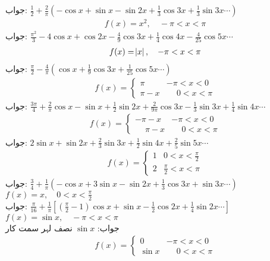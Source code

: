جواب:\quad 
$\tfrac{1}{2}+\tfrac{2}{\pi}(-\cos x+\sin x-\sin 2x+\tfrac{1}{3}\cos 3x+\tfrac{1}{3}\sin 3x\cdots)$
\begin{align*}
f(x)=x^2,\quad -\pi<x<\pi
\end{align*}
جواب:\quad
$\tfrac{\pi^2}{3}-4\cos x+\cos 2x-\tfrac{4}{9}\cos 3x+\tfrac{1}{4}\cos 4x-\tfrac{4}{25}\cos 5x\cdots$
\begin{align*}
f(x)=\abs{x},\quad -\pi<x<\pi
\end{align*}
جواب:\quad
$\tfrac{\pi}{2}-\tfrac{4}{\pi}(\cos x+\tfrac{1}{9}\cos 3x+\tfrac{1}{25}\cos 5x\cdots)$
\begin{align*}
f(x)=
\begin{cases}
\pi & -\pi<x<0\\
\pi-x&\phantom{-}0<x<\pi
\end{cases}
\end{align*}
جواب:\quad
$\tfrac{3\pi}{4}+\tfrac{2}{\pi}\cos x-\sin x+\tfrac{1}{2}\sin 2x+\tfrac{2}{9\pi}\cos 3x-\tfrac{1}{3}\sin 3x+\tfrac{1}{4}\sin 4x\cdots$
\begin{align*}
f(x)=
\begin{cases}
-\pi-x & -\pi<x<0\\
\phantom{-}\pi-x&\phantom{-}0<x<\pi
\end{cases}
\end{align*}
جواب:\quad
$2\sin x+\sin 2x+\tfrac{2}{3}\sin 3x+\tfrac{1}{2}\sin 4x+\tfrac{2}{5}\sin 5x\cdots$
\begin{align*}
f(x)=
\begin{cases}
1& 0<x<\frac{\pi}{2}\\
2&\frac{\pi}{2}<x<\pi
\end{cases}
\end{align*}
جواب:\quad
$\tfrac{3}{4}+\tfrac{1}{\pi}(-\cos x+3\sin x-\sin 2x+\tfrac{1}{3}\cos 3x+\sin 3x\cdots)$
\quad
$f(x)=x,\quad  0<x<\frac{\pi}{2}$\\
جواب:\quad
$\tfrac{\pi}{16}+\tfrac{1}{\pi}[(\tfrac{\pi}{2}-1)\cos x+\sin x-\tfrac{1}{2}\cos 2x+\tfrac{1}{4}\sin 2x\cdots]$
\quad
$f(x)=\sin x,\quad -\pi<x<\pi$\\
جواب:\quad
$\sin x$
\quad نصف لہر سمت کار
\begin{align*}
f(x)=
\begin{cases}
0& -\pi<x<0\\
\sin x&\phantom{-} 0<x<\pi
\end{cases}
\end{align*}
